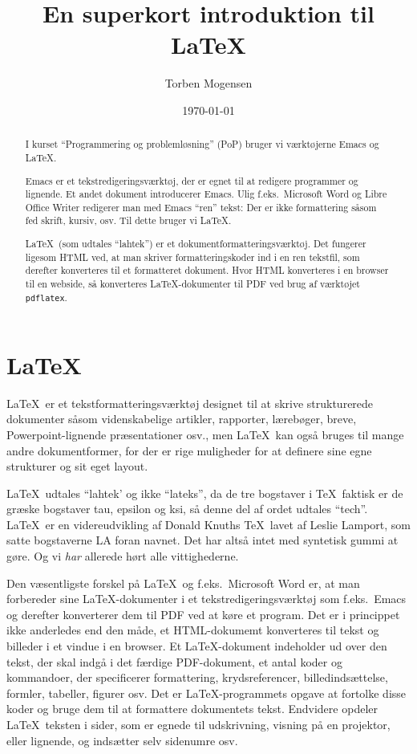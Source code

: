 \documentclass[a4paper]{report}
\begin{document}
\title{En superkort introduktion til \LaTeX}

\author{Torben Mogensen}
\date{\today}

\maketitle

\begin{abstract}
I kurset ``Programmering og problemløsning'' (PoP) bruger vi
værktøjerne Emacs og \LaTeX.

Emacs er et tekstredigeringsværktøj, der er egnet til at redigere
programmer og lignende.  Et andet dokument introducerer Emacs. Ulig f.eks.\ Microsoft Word og Libre Office
Writer redigerer man med Emacs ``ren'' tekst: Der er ikke formattering
såsom fed skrift, kursiv, osv.  Til dette bruger vi \LaTeX.

\LaTeX\ (som udtales ``lahtek'') er et dokumentformatteringsværktøj.
Det fungerer ligesom HTML ved, at man skriver formatteringskoder ind i
en ren tekstfil, som derefter konverteres til et formatteret dokument.
Hvor HTML konverteres i en browser til en webside, så konverteres
\LaTeX-dokumenter til PDF ved brug af værktøjet \texttt{pdflatex}.
\end{abstract}

\tableofcontents


\chapter{\LaTeX}

\LaTeX\ er et tekstformatteringsværktøj designet til at skrive
strukturerede dokumenter såsom videnskabelige artikler, rapporter,
lærebøger, breve, Powerpoint-lignende præsentationer osv., men
\LaTeX\ kan også bruges til mange andre dokumentformer, for der er
rige muligheder for at definere sine egne strukturer og sit eget
layout.

\LaTeX\ udtales ``lahtek' og ikke ``lateks'', da de tre bogstaver i
\TeX\ faktisk er de græske bogstaver tau, epsilon og ksi, så denne del
af ordet udtales ``tech''. \LaTeX\ er en videreudvikling af Donald
Knuths \TeX\ lavet af Leslie Lamport, som satte bogstaverne LA foran
navnet.  Det har altså intet med syntetisk gummi at gøre.  Og vi
\emph{har} allerede hørt alle vittighederne.

Den væsentligste forskel på \LaTeX\ og f.eks.~Microsoft Word er, at man
forbereder sine \LaTeX-dokumenter i et tekstredigeringsværktøj som
f.eks.~Emacs og derefter konverterer dem til PDF ved at køre et
program.  Det er i princippet ikke anderledes end den måde, et
HTML-dokumemt konverteres til tekst og billeder i et vindue i en
browser.  Et \LaTeX-dokument indeholder ud over den tekst, der skal
indgå i det færdige PDF-dokument, et antal koder og kommandoer, der
specificerer formattering, krydsreferencer, billedindsættelse,
formler, tabeller, figurer osv.  Det er \LaTeX-programmets opgave at
fortolke disse koder og bruge dem til at formattere dokumentets tekst.
Endvidere opdeler \LaTeX\ teksten i sider, som er egnede til
udskrivning, visning på en projektor, eller lignende, og indsætter
selv sidenumre osv.
\end{document}

